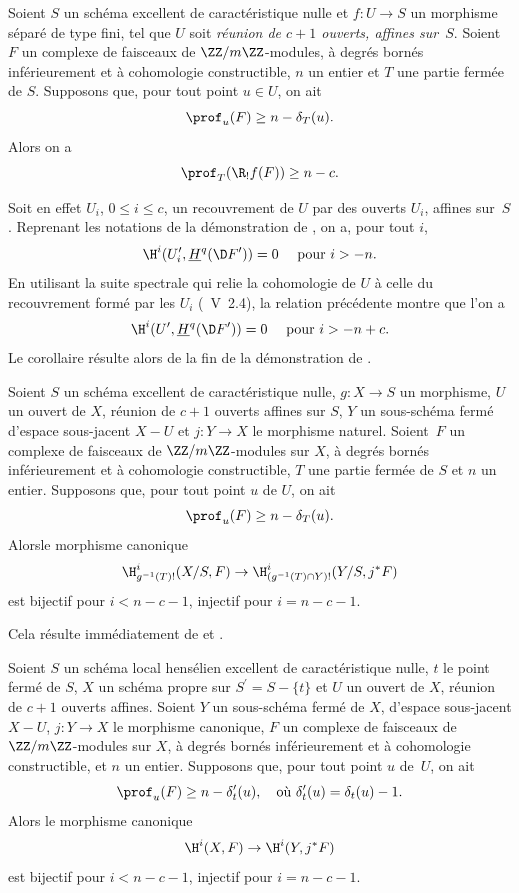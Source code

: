 \begin{corollaire} \label{XIV.4.3}
Soient $S$ un sch\'ema excellent de caract\'eristique nulle et $f\colon U\to S$ un morphisme s\'epar\'e de type fini, tel que $U$ soit \emph{r\'eunion de $c+1$ ouverts, affines sur~$S$}. Soient $F$ un complexe de faisceaux de $\ZZ/m\ZZ$-modules, \`a degr\'es born\'es inf\'erieurement et \`a cohomologie constructible, $n$ un entier et $T$ une partie ferm\'ee de $S$. Supposons que, pour tout point $u\in U$, on ait
$$
\prof_{u}(F)\geq n-\delta_{T}(u).
$$
Alors on a\pageoriginale
$$
\prof_{T}(\R_{!}f(F))\geq n-c.
$$
\end{corollaire}

Soit en effet $U_{i}$, $0\leq i\leq c$, un recouvrement de $U$ par des ouverts $U_{i}$, affines sur~$S$. Reprenant les notations de la d\'emonstration de , on a, pour tout $i$,
$$
\H^{i}(U_{i}^{\prime}, \underline{H}^{q}(\D F^{\prime}))=0\quad\textrm{ pour }i>-n.
$$
En utilisant la suite spectrale qui relie la cohomologie de $U$ \`a celle du recouvrement form\'e par les $U_{i}$ (~V~2.4), la relation pr\'ec\'edente montre que l'on a
$$
\H^{i}(U^{\prime}, \underline{H}^{q}(\D F^{\prime}))=0\quad\textrm{ pour }i>-n+c.
$$
Le corollaire r\'esulte alors de la fin de la d\'emonstration de .

\begin{corollaire} \label{XIV.4.4}
Soient $S$ un sch\'ema excellent de caract\'eristique nulle, $g\colon X\to S$ un morphisme, $U$ un ouvert de $X$, r\'eunion de $c+1$ ouverts affines sur $S$, $Y$ un sous-sch\'ema ferm\'e d'espace sous-jacent $X-U$ et $j\colon Y\to X$ le morphisme naturel. Soient~$F$ un complexe de faisceaux de $\ZZ/m\ZZ$-modules sur $X$, \`a degr\'es born\'es inf\'erieurement et \`a cohomologie constructible, $T$ une partie ferm\'ee de $S$ et $n$ un entier. Supposons que, pour tout point $u$ de $U$, on ait
$$
\prof_{u}(F)\geq n-\delta_{T}(u).
$$
Alors\pageoriginale le morphisme canonique
$$
\H_{g^{-1}(T)!}^{i}(X/S, F)\to\H_{(g^{-1}(T)\cap Y)!}^{i}(Y/S, j^{\ast}F)$$
est bijectif pour $i<n-c-1$, injectif pour $i=n-c-1$.
\end{corollaire}

Cela r\'esulte imm\'ediatement de  et .

\begin{corollaire} \label{XIV.4.5}
Soient $S$ un sch\'ema local hens\'elien excellent de caract\'eristique nulle, $t$ le point ferm\'e de $S$, $X$ un sch\'ema propre sur $S^{\prime}=S-\{ t\}$ et $U$ un ouvert de $X$, r\'eunion de $c+1$ ouverts affines. Soient $Y$ un sous-sch\'ema ferm\'e de $X$, d'espace sous-jacent $X-U$, $j\colon Y\to X$ le morphisme canonique, $F$ un complexe de faisceaux de $\ZZ/m\ZZ$-modules sur $X$, \`a degr\'es born\'es inf\'erieurement et \`a cohomologie constructible, et $n$ un entier. Supposons que, pour tout point $u$ de~$U$, on ait
$$
\prof_{u}(F)\geq n-\delta_{t}^{\prime}(u), \quad\text{o\`u } \delta_{t}^{\prime}(u)=\delta_{t}(u)-1.
$$
Alors le morphisme canonique
$$
\H^{i}(X, F)\to\H^{i}(Y, j^{\ast}F)$$
est bijectif pour $i<n-c-1$, injectif pour $i=n-c-1$.
\end{corollaire}

